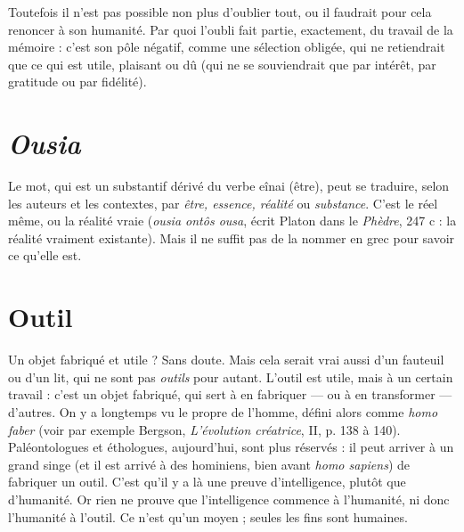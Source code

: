 \vspace{0.5cm}


Toutefois il n’est pas possible non plus d'oublier tout, ou il faudrait pour
cela renoncer à son humanité. Par quoi l’oubli fait partie, exactement, du travail
de la mémoire : c’est son pôle négatif, comme une sélection obligée, qui ne
retiendrait que ce qui est utile, plaisant ou dû (qui ne se souviendrait que par
intérêt, par gratitude ou par fidélité).

\section{\it Ousia}
Le mot, qui est un substantif dérivé du verbe eînai (être), peut se traduire,
selon les auteurs et les contextes, par {\it être, essence, réalité} ou
{\it substance}. C’est le réel même, ou la réalité vraie ({\it ousia ontôs ousa}, écrit Platon
dans le {\it Phèdre}, 247 c : la réalité vraiment existante). Mais il ne suffit pas de la
nommer en grec pour savoir ce qu’elle est.

\section{Outil}
Un objet fabriqué et utile ? Sans doute. Mais cela serait vrai aussi
d’un fauteuil ou d’un lit, qui ne sont pas {\it outils} pour autant. L'outil
est utile, mais à un certain travail : c’est un objet fabriqué, qui sert à en fabriquer
— ou à en transformer — d’autres. On y a longtemps vu le propre de
l’homme, défini alors comme {\it homo faber} (voir par exemple Bergson, {\it L'évolution
créatrice}, II, p. 138 à 140). Paléontologues et éthologues, aujourd’hui, sont
plus réservés : il peut arriver à un grand singe (et il est arrivé à des hominiens,
bien avant {\it homo sapiens}) de fabriquer un outil. C’est qu’il y a là une preuve
d'intelligence, plutôt que d'humanité. Or rien ne prouve que l'intelligence
commence à l'humanité, ni donc l’humanité à l’outil. Ce n’est qu’un moyen ;
seules les fins sont humaines.
